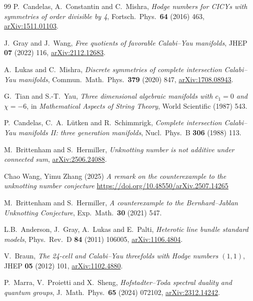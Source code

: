 \documentclass[11pt,a4paper]{article}
\theoremstyle{definition}
\begin{document}
\begin{thebibliography}{99}
P.~Candelas, A.~Constantin and C.~Mishra,
\emph{Hodge numbers for CICYs with symmetries of order divisible by 4},
Fortsch.\ Phys.\ \textbf{64} (2016) 463,
\href{https://arxiv.org/abs/1511.01103}{arXiv:1511.01103}.

J.~Gray and J.~Wang,
\emph{Free quotients of favorable Calabi--Yau manifolds},
JHEP \textbf{07} (2022) 116,
\href{https://arxiv.org/abs/2112.12683}{arXiv:2112.12683}.

A.~Lukas and C.~Mishra,
\emph{Discrete symmetries of complete intersection Calabi--Yau manifolds},
Commun.\ Math.\ Phys.\ \textbf{379} (2020) 847,
\href{https://arxiv.org/abs/1708.08943}{arXiv:1708.08943}.

G.~Tian and S.-T.~Yau,
\emph{Three dimensional algebraic manifolds with $c_1 = 0$ and $\chi = -6$},
in \emph{Mathematical Aspects of String Theory}, World Scientific (1987) 543.

P.~Candelas, C.~A.~L\"utken and R.~Schimmrigk,
\emph{Complete intersection Calabi--Yau manifolds II: three generation
manifolds},
Nucl.\ Phys.\ B \textbf{306} (1988) 113.

M.~Brittenham and S.~Hermiller,
\emph{Unknotting number is not additive under connected sum},
\href{https://arxiv.org/abs/2506.24088}{arXiv:2506.24088}.

Chao Wang, Yimu Zhang (2025)
\emph{A remark on the counterexample to the unknotting number conjecture}
\url{https://doi.org/10.48550/arXiv.2507.14265}


M.~Brittenham and S.~Hermiller,
\emph{A counterexample to the Bernhard--Jablan Unknotting Conjecture},
Exp.\ Math.\ \textbf{30} (2021) 547.


L.B.~Anderson, J.~Gray, A.~Lukas and E.~Palti,
\emph{Heterotic line bundle standard models},
Phys.\ Rev.\ D \textbf{84} (2011) 106005,
\href{https://arxiv.org/abs/1106.4804}{arXiv:1106.4804}.

V.~Braun,
\emph{The 24-cell and Calabi--Yau threefolds with Hodge numbers $(1,1)$},
JHEP \textbf{05} (2012) 101,
\href{https://arxiv.org/abs/1102.4880}{arXiv:1102.4880}.

P.~Marra, V.~Proietti and X.~Sheng,
\emph{Hofstadter--Toda spectral duality and quantum groups},
J.\ Math.\ Phys.\ \textbf{65} (2024) 072102,
\href{https://arxiv.org/abs/2312.14242}{arXiv:2312.14242}.



\end{thebibliography}
\end{document}
